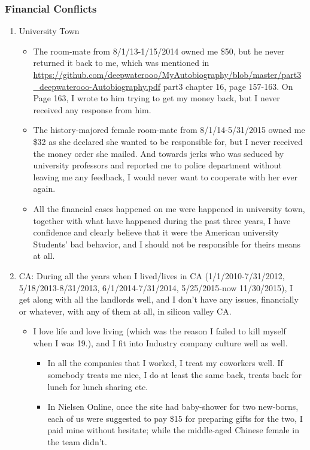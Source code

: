\documentclass[9pt,b5paper]{article}
\begin{document}
\subsubsection{Financial Conflicts}
\label{sec-2-4-2}
\begin{enumerate}
\item University Town
\label{sec-2-4-2-1}
\begin{itemize}
\item The room-mate from 8/1/13-1/15/2014 owned me \$50, but he never returned it back to me, which was mentioned in \url{https://github.com/deepwaterooo/MyAutobiography/blob/master/part3_deepwaterooo-Autobiography.pdf} part3 chapter 16, page 157-163. On Page 163, I wrote to him trying to get my money back, but I never received any response from him.
\item The history-majored female room-mate from 8/1/14-5/31/2015 owned me \$32 as she declared she wanted to be responsible for, but I never received the money order she mailed. And towards jerks who was seduced by university professors and reported me to police department without leaving me any feedback, I would never want to cooperate with her ever again.
\item All the financial cases happened on me were happened in university town, together with what have happened during the past three years, I have confidence and clearly believe that it were the American university Students' bad behavior, and I should not be responsible for theirs means at all.
\end{itemize}
\item CA: During all the years when I lived/lives in CA (1/1/2010-7/31/2012, 5/18/2013-8/31/2013, 6/1/2014-7/31/2014, 5/25/2015-now 11/30/2015), I get along with all the landlords well, and I don't have any issues, financially or whatever, with any of them at all, in silicon valley CA.
\label{sec-2-4-2-2}
\begin{itemize}
\item I love life and love living (which was the reason I failed to kill myself when I was 19.), and I fit into Industry company culture well as well. 
\begin{itemize}
\item In all the companies that I worked, I treat my coworkers well. If somebody treats me nice, I do at least the same back, treats back for lunch for lunch sharing etc.
\item In Nielsen Online, once the site had baby-shower for two new-borns, each of us were suggested to pay \$15 for preparing gifts for the two, I paid mine without hesitate; while the middle-aged Chinese female in the team didn't.

\end{itemize}
\end{itemize}
\end{enumerate}
\end{document}
